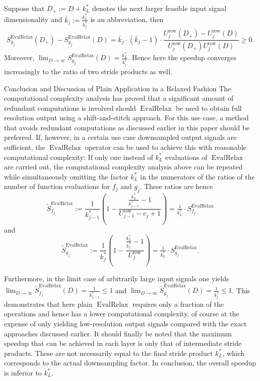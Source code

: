 \documentclass[journal]{IEEEtran}
\makeatletter
\def\subsubsection{\@startsection{subsubsection} {3} {\z@} {1.5ex plus 1.5ex minus 0.5ex} {0.7ex plus .5ex minus 0ex} {\normalfont\normalsize\itshape}}
\newcommand{\row}{\operatorname{row}}
\DeclareMathOperator{\EvalRelax}{EvalRelax}
\makeatother
\begin{document}
Suppose that $D_+ := D + k_L^*$ denotes the next larger feasible input signal dimensionality and $\bar{k}_j := \tfrac{k_L^*}{k_j^*}$ is an abbreviation, then
\begin{displaymath}
  S_{g_j}^{\EvalRelax}(D_+) - S_{g_j}^{\EvalRelax}(D)
  = \bar{k}_j\cdot(\bar{k}_j - 1)\cdot\frac{U_j^{\row}(D_+) - U_j^{\row}(D)}{U_j^{\row}(D_+) U_j^{\row}(D)}
  \geq 0\text{.}
\end{displaymath}
Moreover, $\lim_{D\to\infty} S_{g_j}^{\EvalRelax}(D) = \frac{k_L^*}{k_j^*}$.
Hence here the speedup converges increasingly to the ratio of two stride products as well.

\subsubsection{Conclusion and Discussion of Plain Application in a Relaxed Fashion}
The computational complexity analysis has proved that a significant amount of redundant computations is involved should $\EvalRelax$ be used to obtain full resolution output using a shift-and-stitch approach.
For this use case, a method that avoids redundant computations as discussed earlier in this paper should be preferred.
If, however, in a certain use case downsampled output signals are sufficient, the $\EvalRelax$ operator can be used to achieve this with reasonable computational complexity:
If only one instead of $k_L^*$ evaluations of $\EvalRelax$ are carried out, the computational complexity analysis above can be repeated while simultaneously omitting the factor $k_L^*$ in the numerators of the ratios of the number of function evaluations for $f_j$ and $g_j$.
These ratios are hence
\begin{displaymath}
  \tilde{S}_{f_j}^{\EvalRelax}
  := \frac{1}{k_{j - 1}^*}\left(1 - \frac{\tfrac{k_L^*}{k_{j - 1}^*} - 1}{U_{j - 1}^{\row} - c_j + 1}\right)
  = \tfrac{1}{k_L^*}\cdot S_{f_j}^{\EvalRelax}
\end{displaymath}
and
\begin{displaymath}
  \tilde{S}_{g_j}^{\EvalRelax}
  := \frac{1}{k_j^*}\left(1 - \frac{\tfrac{k_L^*}{k_j^*} - 1}{U_j^{\row}}\right)
  = \tfrac{1}{k_L^*}\cdot S_{g_j}^{\EvalRelax}\text{.}
\end{displaymath}

Furthermore, in the limit case of arbitrarily large input signals one yields $\lim_{D\to\infty} \tilde{S}_{f_j}^{\EvalRelax}(D) = \frac{1}{k_{j - 1}^*} \leq 1$ and $\lim_{D\to\infty} \tilde{S}_{g_j}^{\EvalRelax}(D) = \frac{1}{k_j^*} \leq 1$.
This demonstrates that here plain $\EvalRelax$ requires only a fraction of the operations and hence has a lower computational complexity, of course at the expense of only yielding low-resolution output signals compared with the exact approaches discussed earlier.
It should finally be noted that the maximum speedup that can be achieved in each layer is only that of intermediate stride products.
These are not necessarily equal to the final stride product $k_L^*$, which corresponds to the actual downsampling factor.
In conclusion, the overall speedup is inferior to $k_L^*$.
\end{document}
